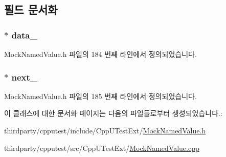 \subsection{필드 문서화}
\subsubsection[{\texorpdfstring{data\+\_\+}{data_}}]{$\ast$ data\+\_\+\hspace{0.3cm}{\ttfamily [private]}}\hypertarget{class_mock_named_value_list_node_ab749429ebd2ea1be2ba34f32ea8d4406}{}\label{class_mock_named_value_list_node_ab749429ebd2ea1be2ba34f32ea8d4406}


Mock\+Named\+Value.\+h 파일의 184 번째 라인에서 정의되었습니다.

\subsubsection[{\texorpdfstring{next\+\_\+}{next_}}]{$\ast$ next\+\_\+\hspace{0.3cm}{\ttfamily [private]}}\hypertarget{class_mock_named_value_list_node_a0cb6abfe488f90be4d539bc57f3a4708}{}\label{class_mock_named_value_list_node_a0cb6abfe488f90be4d539bc57f3a4708}


Mock\+Named\+Value.\+h 파일의 185 번째 라인에서 정의되었습니다.



이 클래스에 대한 문서화 페이지는 다음의 파일들로부터 생성되었습니다.\+:\begin{DoxyCompactItemize}
\item 
thirdparty/cpputest/include/\+Cpp\+U\+Test\+Ext/\hyperlink{_mock_named_value_8h}{Mock\+Named\+Value.\+h}\item 
thirdparty/cpputest/src/\+Cpp\+U\+Test\+Ext/\hyperlink{_mock_named_value_8cpp}{Mock\+Named\+Value.\+cpp}\end{DoxyCompactItemize}
